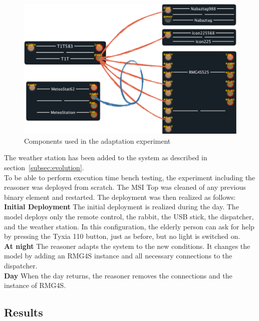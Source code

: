 \begin{figure}[h!]
\centering
\includegraphics[width=\textwidth]{part4/pics/validAdapt}
\caption{Components used in the adaptation experiment}
\end{figure}


The weather station has been added to the system as described in section~\ref{subsec:evolution}.\\

To be able to perform execution time bench testing, the experiment including the reasoner was deployed from scratch.
The MSI Top was cleaned of any previous binary element and restarted. The deployment was then realized as follows:\\

{\bf Initial Deployment} The initial deployment is realized during the day. The model deploys only the remote control, the rabbit, the USB stick, the dispatcher, and the weather station. In this configuration, the elderly person can ask for help by pressing the Tyxia 110 button, just as before, but no light is switched on.\\
 
{\bf At night} The reasoner adapts the system to the new conditions. It changes the model by adding an RMG4S instance and all necessary connections to the dispatcher.\\
 
{\bf Day} When the day returns, the reasoner removes the connections and the instance of RMG4S.\\

\subsection{Results}

